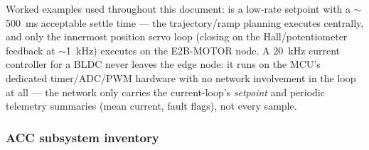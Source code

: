 Worked examples used throughout this document:  is a low-rate setpoint with a $\sim$500~ms acceptable settle time --- the trajectory/ramp planning executes centrally, and only the innermost position servo loop (closing on the Hall/potentiometer feedback at $\sim$1~kHz) executes on the E2B-MOTOR node. A 20~kHz current controller for a BLDC never leaves the edge node: it runs on the MCU's dedicated timer/ADC/PWM hardware with no network involvement in the loop at all --- the network only carries the current-loop's \emph{setpoint} and periodic telemetry summaries (mean current, fault flags), not every sample.

\subsubsection{ACC subsystem inventory}

